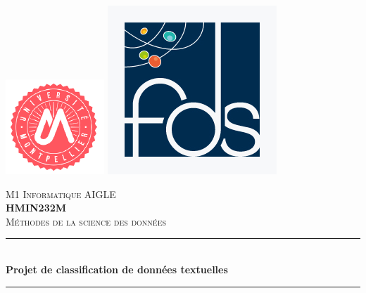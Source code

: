 \documentclass[12pt,a4paper]{report}
\begin{document}
\begin{titlepage}
\newcommand{\HRule}{\rule{\linewidth}{0.5mm}} %
\center

\includegraphics[scale=0.5]{images/umLogo.png} %
\hspace{\fill}
\includegraphics[scale=0.25]{images/fdsLogo.jpg} %

\textsc{\LARGE M1 Informatique AIGLE}\\[1cm]
\textsc{\Large \textbf{HMIN232M}}\\[0.25cm]
\textsc{\large Méthodes de la science des données}\\[0.5cm]

\HRule \\[0.4cm]
{ \huge \bfseries Projet de classification de données textuelles}\\[0.4cm]
\HRule \\[0.5cm]


\end{titlepage}
\end{document}
